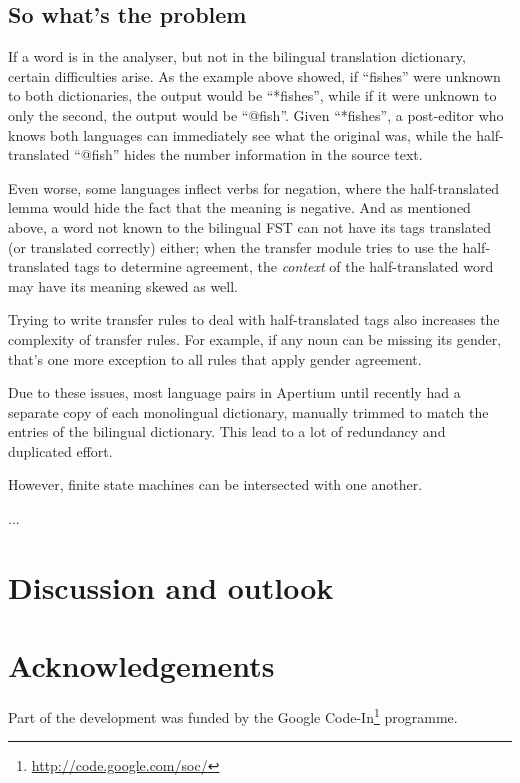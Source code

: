 \documentclass[11pt]{article}
\begin{document}
\subsection{So what's the problem}

If a word is in the analyser, but not in the bilingual translation
dictionary, certain difficulties arise. As the example above showed,
if ``fishes'' were unknown to both dictionaries, the output would be
``*fishes'', while if it were unknown to only the second, the output
would be ``@fish''. Given ``*fishes'', a post-editor who knows both
languages can immediately see what the original was, while the
half-translated ``@fish'' hides the number information in the source
text. 

Even worse, some languages inflect verbs for negation, where the
half-translated lemma would hide the fact that the meaning is
negative. And as mentioned above, a word not known to the bilingual
FST can not have its tags translated (or translated correctly) either;
when the transfer module tries to use the half-translated tags to
determine agreement, the \emph{context} of the half-translated word
may have its meaning skewed as well.

Trying to write transfer rules to deal with half-translated tags also
increases the complexity of transfer rules. For example, if any noun
can be missing its gender, that's one more exception to all rules that
apply gender agreement.

Due to these issues, most language pairs in Apertium until recently
had a separate copy of each monolingual dictionary, manually trimmed
to match the entries of the bilingual dictionary. This lead to a
lot of redundancy and duplicated effort.


However, finite state machines can be intersected with one another.

...

\section{Discussion and outlook}
\section*{Acknowledgements}
Part of the development was funded by the Google
Code-In\footnote{\href{http://code.google.com/soc/}{http://code.google.com/soc/}
} programme.




\end{document}
